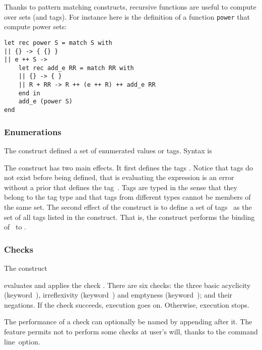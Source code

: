 Thanks to pattern matching constructs,
recursive functions are useful to compute over sets (and tags).
For instance here is the definition of a function \texttt{power} that compute
power sets:
\begin{verbatim}
let rec power S = match S with
|| {} -> { {} }
|| e ++ S ->
    let rec add_e RR = match RR with
    || {} -> { }
    || R + RR -> R ++ (e ++ R) ++ add_e RR
    end in
    add_e (power S)
end
\end{verbatim}

\subsubsection*{\label{sec:enum}Enumerations}
The construct defined a set of enumerated values or tags. Syntax is
\begin{center}
\end{center}
The construct has two main effects.
It first defines the tags .
Notice that tags do not exist before being defined, that is
evaluating the expression  is an error without a prior
 that defines the tag~. Tags are typed in the sense
that they belong to the tag type  and that tags from
different types cannot be members of the same set.
The second effect of the construct is to define a set of tags~
as the set of all tags listed in the construct.
That is, the  construct performs the binding of~
to .


\subsubsection*{\label{sec:check}Checks}
The construct
\begin{center}\end{center}
evaluates  and applies the check .
There are six checks: the three basic acyclicity (keyword~),
irreflexivity (keyword~)
and emptyness (keyword~); and their
negations.
If the check succeeds, execution goes on. Otherwise, execution stops.

\label{name:check:def}The performance of a
check can optionally be named  by appending
 after it.
The feature permits not to perform some checks at user's will,
thanks to the 
command line~option.

